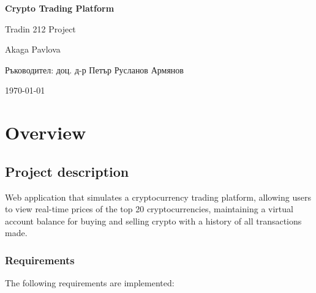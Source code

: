 \documentclass[a4paper,12pt]{article}
\begin{document}
\begin{titlepage}
    \centering
    {\huge\bfseries Crypto Trading Platform \par}
    \vspace{1cm}
    {\Large Tradin 212 Project \par}
    \vspace{1.5cm}
    {\large Akaga Pavlova \par}
    \vfill
    Ръководител: доц. д-р Петър Русланов Армянов \par
    \vspace{0.8cm}
    {\large \today \par}
\end{titlepage}

\tableofcontents
\newpage

\section{Overview}
\subsection{Project description}
Web application that simulates a cryptocurrency trading platform, allowing users to view real-time prices of the top 20 cryptocurrencies,
maintaining a virtual account balance for buying and selling crypto with a history of all transactions made.

\subsubsection{Requirements}
The following requirements are implemented:
\end{document}
